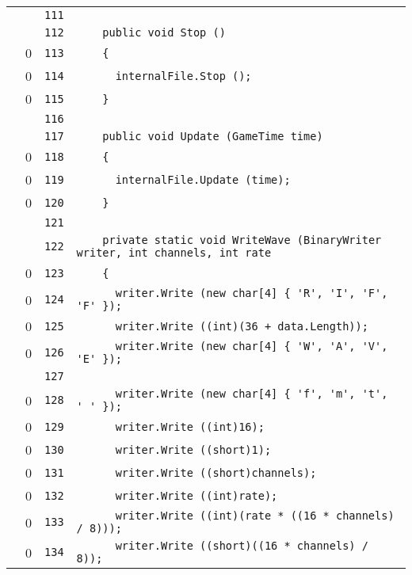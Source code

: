 \documentclass[a4paper,10pt]{article}
\begin{document}
\begin{longtable}[l]{lrrl}
\cellcolor{gray} &  & \verb~111~ & \verb~~\\
\cellcolor{gray} &  & \verb~112~ & \verb~    public void Stop ()~\\
\cellcolor{red} & 0 & \verb~113~ & \verb~    {~\\
\cellcolor{red} & 0 & \verb~114~ & \verb~      internalFile.Stop ();~\\
\cellcolor{red} & 0 & \verb~115~ & \verb~    }~\\
\cellcolor{gray} &  & \verb~116~ & \verb~~\\
\cellcolor{gray} &  & \verb~117~ & \verb~    public void Update (GameTime time)~\\
\cellcolor{red} & 0 & \verb~118~ & \verb~    {~\\
\cellcolor{red} & 0 & \verb~119~ & \verb~      internalFile.Update (time);~\\
\cellcolor{red} & 0 & \verb~120~ & \verb~    }~\\
\cellcolor{gray} &  & \verb~121~ & \verb~~\\
\cellcolor{gray} &  & \verb~122~ & \verb~    private static void WriteWave (BinaryWriter writer, int channels, int rate~\\
\cellcolor{red} & 0 & \verb~123~ & \verb~    {~\\
\cellcolor{red} & 0 & \verb~124~ & \verb~      writer.Write (new char[4] { 'R', 'I', 'F', 'F' });~\\
\cellcolor{red} & 0 & \verb~125~ & \verb~      writer.Write ((int)(36 + data.Length));~\\
\cellcolor{red} & 0 & \verb~126~ & \verb~      writer.Write (new char[4] { 'W', 'A', 'V', 'E' });~\\
\cellcolor{gray} &  & \verb~127~ & \verb~~\\
\cellcolor{red} & 0 & \verb~128~ & \verb~      writer.Write (new char[4] { 'f', 'm', 't', ' ' });~\\
\cellcolor{red} & 0 & \verb~129~ & \verb~      writer.Write ((int)16);~\\
\cellcolor{red} & 0 & \verb~130~ & \verb~      writer.Write ((short)1);~\\
\cellcolor{red} & 0 & \verb~131~ & \verb~      writer.Write ((short)channels);~\\
\cellcolor{red} & 0 & \verb~132~ & \verb~      writer.Write ((int)rate);~\\
\cellcolor{red} & 0 & \verb~133~ & \verb~      writer.Write ((int)(rate * ((16 * channels) / 8)));~\\
\cellcolor{red} & 0 & \verb~134~ & \verb~      writer.Write ((short)((16 * channels) / 8));~\\

\end{longtable}
\end{document}
